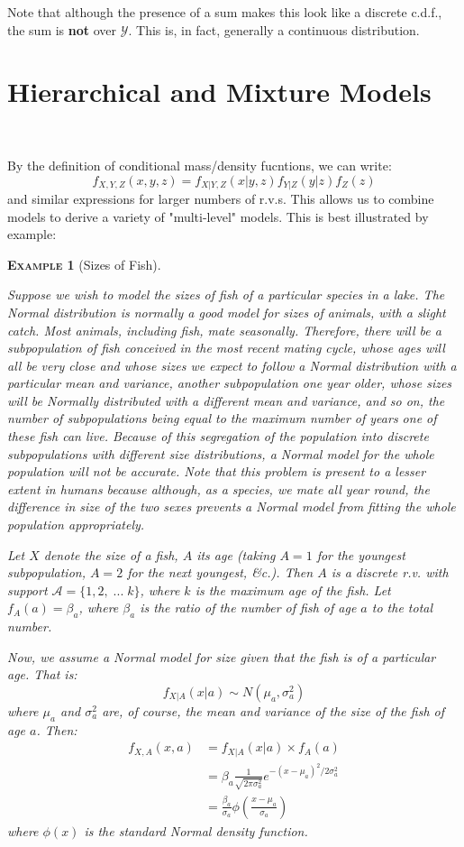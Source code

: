 \documentclass[12pt,a4paper]{article}
\newtheorem{example}{\textsc{Example}}[section]
\begin{document}
Note that although the presence of a sum makes this look like a discrete c.d.f., the sum is \textbf{not} over $\mathcal{Y}$. This is, in fact, generally a continuous distribution.

\clearpage
\section{Hierarchical and Mixture Models}$\;$

By the definition of conditional mass/density fucntions, we can write:
$$f_{X,Y,Z}(x,y,z) = f_{X|Y,Z}(x|y,z) f_{Y|Z}(y|z) f_Z(z)$$
and similar expressions for larger numbers of r.v.s. This allows us to combine models to derive a variety of "multi-level" models. This is best illustrated by example:

\begin{example}[Sizes of Fish]$\quad$\par\vspace{1cm}

Suppose we wish to model the sizes of fish of a particular species in a lake. The Normal distribution is normally a good model for sizes of animals, with a slight catch. Most animals, including fish, mate seasonally. Therefore, there will be a subpopulation of fish conceived in the most recent mating cycle, whose ages will all be very close and whose sizes we expect to follow a Normal distribution with a particular mean and variance, another subpopulation one year older, whose sizes will be Normally distributed \emph{with a different mean and variance}, and so on, the number of subpopulations being equal to the maximum number of years one of these fish can live. Because of this segregation of the population into discrete subpopulations with different size distributions, a Normal model for the whole population will not be accurate. Note that this problem is present to a lesser extent in humans because although, as a species, we mate all year round, the difference in size of the two sexes prevents a Normal model from fitting the whole population appropriately.

Let $X$ denote the size of a fish, $A$ its age (taking $A=1$ for the youngest subpopulation, $A=2$ for the next youngest, \&c.). Then $A$ is a discrete r.v. with support $\mathcal{A} = \{1,2,\; ...\; k\}$, where $k$ is the maximum age of the fish. Let $f_A(a) = \beta_a$, where $\beta_a$ is the ratio of the number of fish of age $a$ to the total number.

Now, we assume a Normal model for size \emph{given that the fish is of a particular age}. That is:
$$f_{X|A}(x|a) \sim N(\mu_a,\sigma_a^2)$$
where $\mu_a$ and $\sigma_a^2$ are, of course, the mean and variance of the size of the fish of age $a$. Then:
\begin{align*}
f_{X,A}(x,a) &= f_{X|A}(x|a) \times f_A(a)\\
&= \beta_a \frac{1}{\sqrt{2 \pi \sigma^2_a}} e^{-(x-\mu_a)^2/2\sigma^2_a}\\
&= \frac{\beta_a}{\sigma_{a}} \phi\left(\frac{x-\mu_a}{\sigma_a}\right)
\end{align*}
where $\phi(x)$ is the standard Normal density function.


\end{example}
\end{document}
